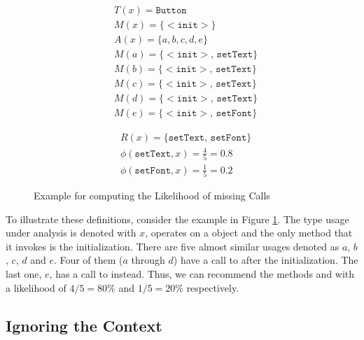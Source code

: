 \begin{figure}[h]
    \begin{subfigure}[c]{0.45\textwidth}
        \begin{align*}
& T(x) = \mathtt{Button} \\
& M(x) = \{ \mathtt{<\!\!init\!\!>} \} \\
& A(x) = \{ a, b, c, d, e \} \\
& M(a) = \{ \mathtt{<\!\!init\!\!>},\, \mathtt{setText} \} \\
& M(b) = \{ \mathtt{<\!\!init\!\!>},\, \mathtt{setText} \} \\
& M(c) = \{ \mathtt{<\!\!init\!\!>},\, \mathtt{setText} \} \\
& M(d) = \{ \mathtt{<\!\!init\!\!>},\, \mathtt{setText} \} \\
& M(e) = \{ \mathtt{<\!\!init\!\!>},\, \mathtt{setFont} \}
        \end{align*}
    \end{subfigure}
    \begin{subfigure}[c]{0.45\textwidth}
        \begin{align*}
& R(x) = \{ \mathtt{setText},\, \mathtt{setFont} \} \\
& \phi(\mathtt{setText}, x) = \frac{4}{5} = 0.8 \\
& \phi(\mathtt{setFont}, x) = \frac{1}{5} = 0.2
        \end{align*}
    \end{subfigure}
    \caption{Example for computing the Likelihood of missing Calls \cite{monperrus2013detecting}}
    \label{fig:missing_calls}
\end{figure}

To illustrate these definitions, consider the example in Figure \ref{fig:missing_calls}.
The type usage under analysis is denoted with $x$, operates on a  object and the only method that it invokes is the initialization.
There are five almost similar usages denoted as $a$, $b$, $c$, $d$ and $e$.
Four of them ($a$ through $d$) have a call to  after the initialization.
The last one, $e$, has a call to  instead.
Thus, we can recommend the methods  and  with a likelihood of $4/5 = 80\%$ and $1/5 = 20\%$ respectively.

\subsection{Ignoring the Context}

